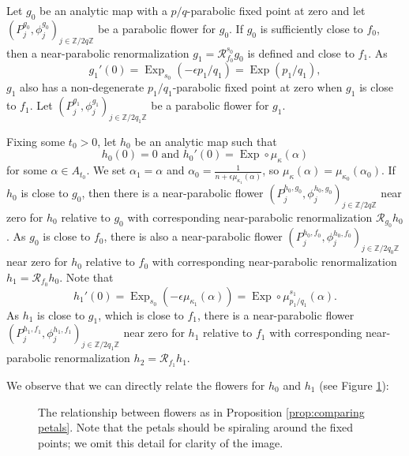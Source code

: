 \documentclass[12pt,letterpaper]{amsart}
\numberwithin{equation}{section}
\theoremstyle{remark}
\theoremstyle{definition}
\newcommand{\Z}{\mathbb Z}
\newcommand{\RR}{\mathcal R}
\DeclareMathOperator{\Exp}{Exp}
\begin{document}
	Let $g_0$ be an analytic map with a $p/q$-parabolic fixed point at zero
	and let $(P_j^{g_0}, \phi_j^{g_0})_{j\in \Z/2q\Z}$ be a parabolic flower for $g_0$.
	If $g_0$ is sufficiently 	
	close to $f_0$, then a near-parabolic renormalization $g_1=\RR_{f_0}^{s_0}g_0$ is defined and close to $f_1$. As $$ g_1'(0)= \Exp_{s_0}(-\epsilon p_1/q_1) = \Exp(p_1/q_1),$$  $g_1$ also has a non-degenerate $p_1/q_1$-parabolic fixed point at zero when $g_1$ is close to $f_1$.  Let $(P_j^{g_1}, \phi_j^{g_1})_{j\in \Z/2q_1\Z}$ be a parabolic flower for $g_1$.
	
	Fixing some $t_0>0$, let $h_0$ be an analytic map such that
	$$h_0(0) = 0\text{ and }h_0'(0) =\Exp\circ \mu_{\kappa}(\alpha)$$ for some $\alpha\in A_{t_0}$. 
	We set $\alpha_1 = \alpha$ and $\alpha_0 = \frac{1}{n+\epsilon \mu_{\kappa_1}(\alpha)}$, so $\mu_{\kappa}(\alpha) = \mu_{\kappa_0}(\alpha_0).$
	If $h_0$ is close to $g_0$, then there is a near-parabolic flower   $(P_j^{h_0, g_0}, \phi_j^{h_0, g_0})_{j\in \Z/2q\Z}$ near zero for $h_0$ relative to $g_0$ with corresponding near-parabolic renormalization
	$\RR_{g_0}h_0$.
	As $g_0$ is close to $f_0$,
	there is also a near-parabolic flower $(P_j^{h_0, f_0}, \phi_j^{h_0, f_0})_{j\in \Z/2q_0\Z}$ near zero for $h_0$ relative to $f_0$ with corresponding near-parabolic renormalization $h_1= \RR_{f_0}h_0$.
	Note that 
	$$h_1'(0) = \Exp_{s_0}(-\epsilon\mu_{\kappa_1}(\alpha)) = \Exp\circ \mu_{p_1/q_1}^{s_1}(\alpha).$$
	As $h_1$ is close to $g_1$, which is close to $f_1$, 
	there is a near-parabolic flower $(P_j^{h_1, f_1}, \phi_j^{h_1, f_1})_{j\in \Z/2q_1\Z}$ near zero for $h_1$ relative to $f_1$ with corresponding near-parabolic renormalization $h_2= \RR_{f_1}h_1$.
	
	We observe that we can directly relate the flowers for $h_0$ and $h_1$ (see Figure \ref{fig:lifts}):
	
		\begin{figure}
		\begin{center}
			\def\svgwidth{12.5cm}
			
			\caption{The relationship between flowers as in Proposition \ref{prop:comparing petals}. Note that the petals should be spiraling around the fixed points; we omit this detail for clarity of the image.}
			\label{fig:lifts}
		\end{center}
	\end{figure}
	
\end{document}
